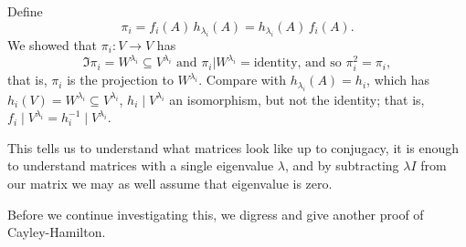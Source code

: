 Define
\begin{equation*}
	\pi_i = f_i(A)\,h_{\lambda_i}(A) = h_{\lambda_i}(A)\,f_i(A).
\end{equation*}
We showed that $\pi_i:V\to V$ has
\begin{equation*}
	\Im \pi_i = W^{\lambda_i} \subseteq V^{\lambda_i}
	\text{ and }
	\pi_i \vert W^{\lambda_i} = \text{identity, and so } \pi_i^2 = \pi_i,
\end{equation*}
that is, $\pi_i$ is the projection to $W^{\lambda_i}$. Compare with $h_{\lambda_i}(A)=h_i$, which has $h_i(V)=W^{\lambda_i}\subseteq V^{\lambda_i}$, $h_i \mid V^{\lambda_i}$ an isomorphism, but not the identity; that is, $f_i \mid V^{\lambda_i} = h_i^{-1} \mid V^{\lambda_i}$.

This tells us to understand what matrices look like up to conjugacy, it is enough to understand matrices with a single eigenvalue $\lambda$, and by subtracting $\lambda I$ from our matrix we may as well assume that eigenvalue is zero.

Before we continue investigating this, we digress and give another proof of Cayley-Hamilton.


